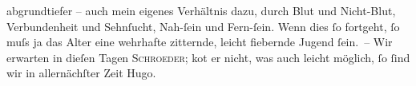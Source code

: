 \begin{ledgroupsized}[t]{13cm}
               abgrundtiefer – auch mein eigenes Verhältnis dazu, durch Blut und Nicht-Blut,
               Verbundenheit und Sehnſucht, Nah-ſein und Fern-ſein. Wenn dies ſo fortgeht, ſo muſs
               ja das Alter eine wehrhafte zitternde, leicht fiebernde Jugend ſein. – Wir erwarten
               in dieſen Tagen \textsc{Schroeder}; ko{\geminationm}t er nicht, was auch leicht möglich, ſo ſind
               wir in allernächſter Zeit \label{T_L02176-1v}\label{T_L02176-1h}\pend
           \pstart \spacefill\mbox{Hugo.}\pend{}
         
         \endnumbering{}\end{ledgroupsized}  \newcommand{\dateiname}{L02176}\newcommand{\titel}{Hugo von Hofmannsthal an Arthur Schnitzler, 16. 4. [1914]}\newcommand{\editorInnen}{Martin Anton Müller und Gerd-Hermann Susen}
      